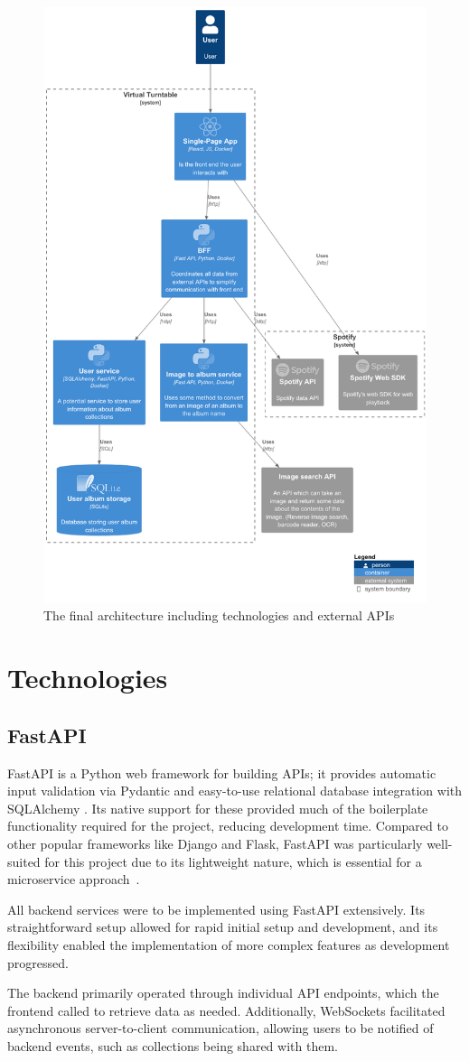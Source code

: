 \begin{figure} [H]
    \centering
    \includegraphics[width=0.5\linewidth]{figures/final_arch.png}
    \caption{The final architecture including technologies and external APIs}
    \label{fig:final-arch}
\end{figure}


\section{Technologies}
\subsection{FastAPI}
FastAPI is a Python web framework for building APIs; it provides automatic input validation via Pydantic and easy-to-use relational database integration with SQLAlchemy \cite{FastAPI}. Its native support for these provided much of the boilerplate functionality required for the project, reducing development time. Compared to other popular frameworks like Django and Flask, FastAPI was particularly well-suited for this project due to its lightweight nature, which is essential for a microservice approach~\cite{9717259}.

All backend services were to be implemented using FastAPI extensively. Its straightforward setup allowed for rapid initial setup and development, and its flexibility enabled the implementation of more complex features as development progressed.

The backend primarily operated through individual API endpoints, which the frontend called to retrieve data as needed. Additionally, WebSockets facilitated asynchronous server-to-client communication, allowing users to be notified of backend events, such as collections being shared with them.

